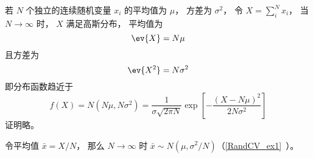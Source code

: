 
\begin{issues}
\issueDraft
\end{issues}


若 $N$ 个独立的连续随机变量 $x_i$ 的平均值为 $\mu$， 方差为 $\sigma^2$， 令 $X = \sum_i^N x_i$， 当 $N \to \infty$ 时， $X$ 满足高斯分布， 平均值为
\begin{equation}
\ev{X} = N\mu
\end{equation}
且方差为
\begin{equation}
\ev{X^2} = N\sigma^2
\end{equation}
即分布函数趋近于
\begin{equation}
f(X) = N(N\mu, N\sigma^2) = \frac{1}{\sigma\sqrt{2\pi N}} \exp[-\frac{(X-N\mu)^2}{2N\sigma^2}]
\end{equation}
证明略。

令平均值 $\bar x = X/N$， 那么 $N\to\infty$ 时 $\bar x\sim N(\mu, \sigma^2/N)$（\autoref{RandCV_ex1}~）。
